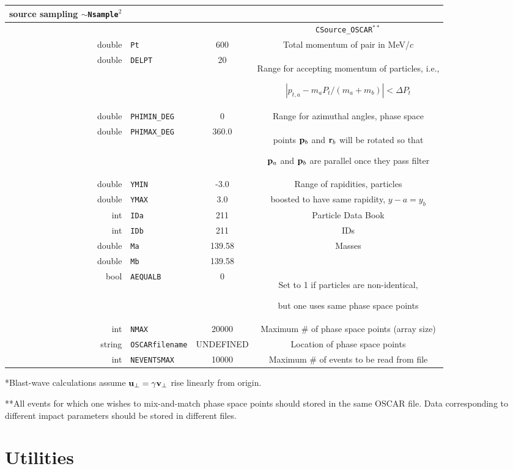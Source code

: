 \documentclass[10pt]{article}
\begin{document}
\begin{center}
\begin{tabular}{|r|l|c|c|}
{\centerline{source sampling $\sim${\tt Nsample}$^2$}}\\ \hline\hline
& & & {\tt CSource\_OSCAR$^{**}$} \\ \hline
double & {\tt Pt} & 600 & Total momentum of pair in MeV/$c$ \\ \hline
double & {\tt DELPT} & 20 & \parbox{3.8in}
{\centerline{Range for accepting momentum of particles, i.e.,}
\centerline{$|p_{t,a}-m_aP_t/(m_a+m_b)|<\Delta P_t$}}\\ \hline
double & {\tt PHIMIN\_DEG} & 0 & Range for azimuthal angles, phase space\\
double & {\tt PHIMAX\_DEG} & 360.0 & \parbox{3.8in}{\centerline{points ${\bf p}_b$ and ${\bf r}_b$ will be rotated so that}
\centerline{${\bf p}_a$ and ${\bf p}_b$ are parallel once they pass filter}}\\ \hline
double & {\tt YMIN} & -3.0 & Range of rapidities, particles\\
double & {\tt YMAX} & 3.0 & boosted to have same rapidity, $y-a=y_b$\\ \hline
int & {\tt IDa} & 211 & Particle Data Book \\
int & {\tt IDb} & 211 & IDs\\ \hline
double & {\tt Ma} & 139.58 & Masses \\
double & {\tt Mb} & 139.58 & \\ \hline
bool & {\tt AEQUALB} & 0 & \parbox{3.8in}{\centerline{Set to 1 if particles are non-identical,}
\centerline{but one uses same phase space points}}\\ \hline
int & {\tt NMAX} & 20000 & Maximum \# of phase space points (array size)\\ \hline
string & {\tt OSCARfilename} & UNDEFINED & Location of phase space points\\ \hline
int & {\tt NEVENTSMAX} & 10000 & Maximum \# of events to be read from file\\ \hline
\end{tabular}
\end{center}
*Blast-wave calculations assume ${\bf u}_\perp=\gamma{\bf v}_\perp$ rise linearly from origin.

**All events for which one wishes to mix-and-match phase space points should stored in the same OSCAR file. Data corresponding to different impact parameters should be stored in different files.
\newpage

\section{Utilities}
\label{sec:utilities}
\end{document}
